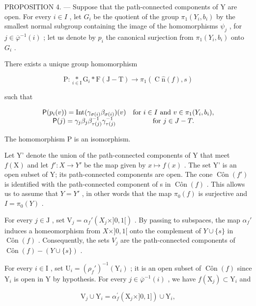 PROPOSITION 4. --- Suppose that the path-connected components of Y are open. For every \(i \in I\) , let \(G_i\) be the quotient of the group \(\pi_1(Y_i, b_i)\) by the smallest normal subgroup containing the image of the homomorphisms \(\psi_j\) , for \(j \in \overline{\varphi}^{-1}(i)\) ; let us denote by \(p_i\) the canonical surjection from \(\pi_1(Y_i, b_i)\) onto \(G_i\) .

There exists a unique group homomorphism

\[
\mathrm{P} \colon \underset {i \in \mathrm{I}} {*} \mathrm{G} _ {i} * \mathrm{F} (\mathrm{J} - \mathrm{T}) \to \pi_ {1} (\operatorname{C} \hat {\mathrm{n}} (f), s)
\]

such that

\[
\begin{array}{c c} \mathsf {P} (p _ {i} (v)) = \operatorname{Int} (\gamma_ {\sigma (i)} \beta_ {\sigma (i)}) (v) & \text {for } i\in I \text { and } v\in\pi_{1} (Y_{i},b_{i}), \\ \mathsf {P} (j) = \gamma_ {j} \beta_ {j} \beta_ {\tau (j)} ^ {- 1} \gamma_ {\tau (j)} ^ {- 1} & \text {for } j\in J - T. \end{array}
\]

The homomorphism P is an isomorphism.

Let Y' denote the union of the path-connected components of Y that meet \(f(\mathrm{X})\) and let \(f'\colon X \to Y'\) be the map given by \(x \mapsto f(x)\) . The set Y' is an open subset of Y; its path-connected components are open. The cone \(\operatorname{Côn}(f')\) is identified with the path-connected component of s in \(\operatorname{Côn}(f)\) . This allows us to assume that \(Y = Y'\) , in other words that the map \(\pi_{0}(f)\) is surjective and \(I = \pi_{0}(Y)\) .

For every \(j \in \mathrm{J}\) , set \(\mathrm{V}_j = \alpha_f'(X_j \times ]0,1[)\) . By passing to subspaces, the map \(\alpha_f'\) induces a homeomorphism from \(X \times ]0,1[\) onto the complement of \(Y \cup \{s\}\) in \(\operatorname{Côn}(f)\) . Consequently, the sets \(V_j\) are the path-connected components of \(\operatorname{Côn}(f) - (Y \cup \{s\})\) .

For every \(i \in \mathrm{I}\) , set \(\mathrm{U}_i = (\rho_f')^{-1}(\mathrm{Y}_i)\) ; it is an open subset of \(\operatorname{Côn}(f)\) since \(\mathrm{Y}_i\) is open in \(\mathrm{Y}\) by hypothesis. For every \(j \in \overline{\varphi}^{-1}(i)\) , we have \(f(\mathrm{X}_j) \subset \mathrm{Y}_i\) and

\[
\mathrm{V} _ {j} \cup \mathrm{Y} _ {i} = \alpha_ {f} ^ {\prime} (\mathrm{X} _ {j} \times ] 0, 1 ]) \cup \mathrm{Y} _ {i},
\]

